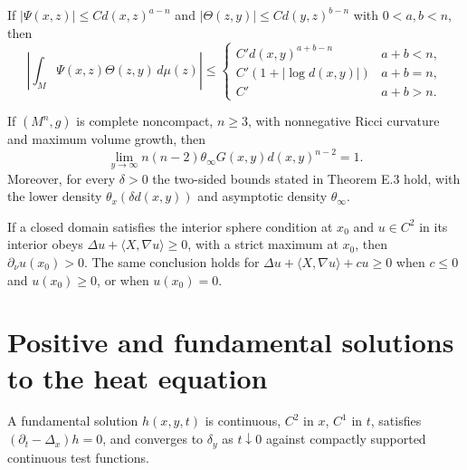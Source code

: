 \begin{lemma}
\label{lem:chow-ii-green-convolution-estimate}
If $|\Psi(x,z)|\le C d(x,z)^{a-n}$ and
$|\Theta(z,y)|\le C d(y,z)^{b-n}$ with $0<a,b<n$, then
\[
\left|\int_M\Psi(x,z)\Theta(z,y)\,d\mu(z)\right|
\le\begin{cases}C'd(x,y)^{a+b-n}&a+b<n,\\
C'(1+|\log d(x,y)|)&a+b=n,\\ C'&a+b>n.
\end{cases}
\]
\end{lemma}

\begin{theorem}
\label{thm:chow-ii-green-asymptotics}
If $(M^n,g)$ is complete noncompact, $n\ge3$, with nonnegative Ricci
curvature and maximum volume growth, then
\[
\lim_{y\to\infty}n(n-2)\theta_\infty G(x,y)d(x,y)^{n-2}=1.
\]
Moreover, for every $\delta>0$ the two-sided bounds stated in Theorem E.3
hold, with the lower density $\theta_x(\delta d(x,y))$ and asymptotic density
$\theta_\infty$.
\end{theorem}

\begin{theorem}
\label{thm:chow-ii-hopf-boundary-point}
If a closed domain satisfies the interior sphere condition at $x_0$ and
$u\in C^2$ in its interior obeys $\Delta u+\langle X,\nabla u\rangle\ge0$,
with a strict maximum at $x_0$, then $\partial_\nu u(x_0)>0$.  The same
conclusion holds for $\Delta u+\langle X,\nabla u\rangle+cu\ge0$ when
$c\le0$ and $u(x_0)\ge0$, or when $u(x_0)=0$.
\end{theorem}

\section{Positive and fundamental solutions to the heat equation}

\begin{definition}
\label{def:chow-ii-heat-fundamental-solution}
A fundamental solution $h(x,y,t)$ is continuous, $C^2$ in $x$, $C^1$ in $t$,
satisfies $(\partial_t-\Delta_x)h=0$, and converges to $\delta_y$ as
$t\downarrow0$ against compactly supported continuous test functions.
\end{definition}

